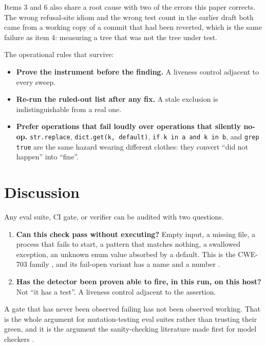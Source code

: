 \documentclass[11pt]{article}
\begin{document}
Items 3 and 6 also share a root cause with two of the errors this paper corrects. The wrong
refusal-site idiom and the wrong test count in the earlier draft both came from a working copy
of a commit that had been reverted, which is the same failure as item 4: measuring a tree that
was not the tree under test.

The operational rules that survive:

\begin{itemize}
\item \textbf{Prove the instrument before the finding.} A liveness control adjacent to every
sweep.
\item \textbf{Re-run the ruled-out list after any fix.} A stale exclusion is
indistinguishable from a real one.
\item \textbf{Prefer operations that fail loudly over operations that silently no-op.}
\texttt{str.replace}, \texttt{dict.get(k, default)}, \texttt{if k in a and k in b}, and
\texttt{grep \textbar{} true} are the same hazard wearing different clothes: they convert ``did not
happen'' into ``fine''.
\end{itemize}

\section{Discussion}
\label{sec:discussion}

Any eval suite, CI gate, or verifier can be audited with two questions.

\begin{enumerate}
\item \textbf{Can this check pass without executing?} Empty input, a missing file, a process
that fails to start, a pattern that matches nothing, a swallowed exception, an unknown enum
value absorbed by a default. This is the CWE-703 family \citep{cwe703}, and its fail-open
variant has a name and a number \citep{cwe636}.
\item \textbf{Has the detector been proven able to fire, in this run, on this host?} Not ``it
has a test''. A liveness control adjacent to the assertion.
\end{enumerate}

A gate that has never been observed failing has not been observed working. That is the whole
argument for mutation-testing eval suites rather than trusting their green, and it is the
argument the sanity-checking literature made first for model checkers
\citep{kupferman2006sanity}.
\end{document}
